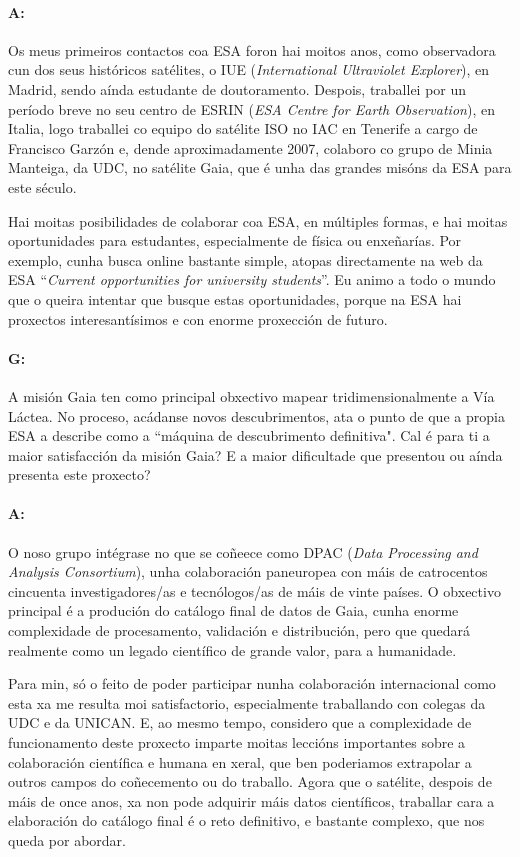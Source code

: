 \begin{refsection}
\begin{multicols}{2}
\paragraph{A:} Os meus primeiros contactos coa ESA foron hai moitos anos, como
observadora cun dos seus históricos satélites, o IUE (\textit{International
Ultraviolet Explorer}), en Madrid, sendo aínda estudante de doutoramento.
Despois, traballei por un período breve no seu centro de ESRIN (\textit{ESA
Centre for Earth Observation}), en Italia, logo traballei co equipo do satélite
ISO no IAC en Tenerife a cargo de Francisco Garzón e, dende aproximadamente
2007, colaboro co grupo de Minia Manteiga, da UDC, no satélite Gaia, que é unha
das grandes misóns da ESA para este século.

Hai moitas posibilidades de colaborar coa ESA, en múltiples formas, e hai
moitas oportunidades para estudantes, especialmente de física ou enxeñarías.
Por exemplo, cunha busca online bastante simple, atopas directamente na web da
ESA  “\textit{Current opportunities for university students}”. Eu animo a todo
o mundo que o queira intentar que busque estas oportunidades, porque na ESA hai
proxectos interesantísimos e con enorme proxección de futuro.

\paragraph{G:} A misión Gaia ten como principal obxectivo mapear
tridimensionalmente a Vía Láctea. No proceso, acádanse novos descubrimentos,
ata o punto de que a propia ESA a describe como a ``máquina de descubrimento
definitiva". Cal é para ti a maior satisfacción da misión Gaia? E a maior
dificultade que presentou ou aínda presenta este proxecto?

\paragraph{A:} O noso grupo intégrase no que se coñeece como DPAC (\textit{Data
Processing and Analysis Consortium}), unha colaboración paneuropea con máis de
catrocentos cincuenta investigadores/as e tecnólogos/as de máis de vinte
países. O obxectivo principal é a produción do catálogo final de datos de Gaia,
cunha enorme complexidade de procesamento, validación e distribución, pero que
quedará realmente como un legado científico de grande valor, para a humanidade.

Para min, só o feito de poder participar nunha colaboración internacional como
esta xa me resulta moi satisfactorio, especialmente traballando con colegas da
UDC e da UNICAN. E, ao mesmo tempo, considero que a complexidade de
funcionamento deste proxecto imparte moitas leccións importantes sobre a
colaboración científica e humana en xeral, que ben poderiamos extrapolar a
outros campos do coñecemento ou do traballo. Agora que o satélite, despois de
máis de once anos, xa non pode adquirir máis datos científicos, traballar cara
a elaboración do catálogo final é o reto definitivo, e bastante complexo, que
nos queda por abordar.


\end{multicols}
\end{refsection}
